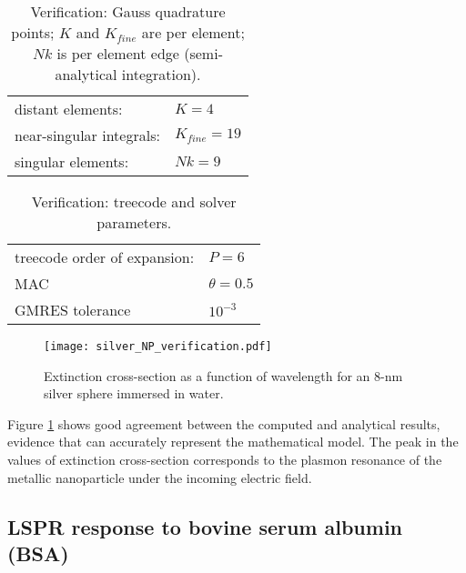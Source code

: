 \begin{table}[h]
    \centering
    \caption{\label{table:quadparams2} Verification: Gauss quadrature points; 
    $K$ and $K_{fine}$ are per element; $Nk $ is per element edge (semi-analytical integration). } 
    \begin{tabular}{l l}
    \hline%
     distant elements: & $K=4$ \\
     near-singular integrals:   & $ K_{fine}=19$ \\
     singular elements:  & $Nk =9$ \\
    \hline%
    \end{tabular}
\end{table}


\begin{table}[h]
    \centering
    \caption{\label{table:treeparams2} Verification: treecode and solver parameters.} 
    \begin{tabular}{l l}
    \hline%
    treecode order of expansion: & $P=6$\\
    MAC                                         & $\theta=0.5$\\
    GMRES tolerance                    & $10^{-3}$\\
    \hline%
    \end{tabular}
\end{table}


\begin{figure}[h] %
   \centering
   \texttt{[image: silver\_NP\_verification.pdf]} 
   \caption{Extinction cross-section as a function of wavelength for an $8$-nm
            silver sphere immersed in water.}
   \label{fig:verif_sphere}
\end{figure}

Figure \ref{fig:verif_sphere} shows good agreement between the computed and analytical results, 
evidence that \pygbe can accurately represent the mathematical model. The 
peak in the values of extinction cross-section corresponds to the plasmon resonance of the metallic
nanoparticle under the incoming electric field.


\subsection{LSPR response to bovine serum albumin (BSA)} \label{sec:lspr_response}


